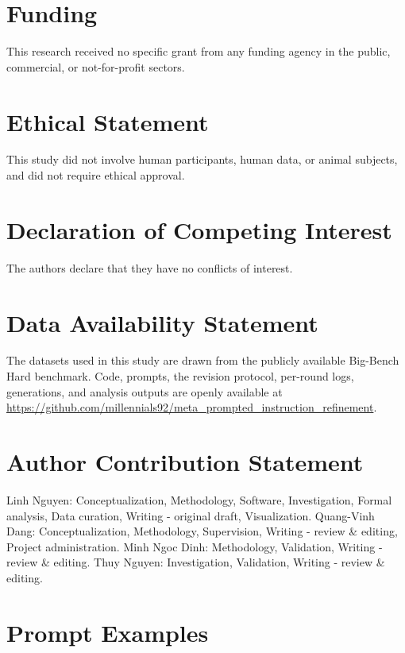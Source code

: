 \documentclass{ieeeaccess}
\begin{document}
\section{Funding}

This research received no specific grant from any funding agency in the public, commercial, or not-for-profit sectors.

\section{Ethical Statement}

This study did not involve human participants, human data, or animal subjects, and did not require ethical approval.

\section{Declaration of Competing Interest}

The authors declare that they have no conflicts of interest.

\section{Data Availability Statement}

The datasets used in this study are drawn from the publicly available Big-Bench Hard benchmark. Code, prompts, the revision protocol, per-round logs, generations, and analysis outputs are openly available at \url{https://github.com/millennials92/meta_prompted_instruction_refinement}.

\section{Author Contribution Statement}

Linh Nguyen: Conceptualization, Methodology, Software, Investigation, Formal analysis, Data curation, Writing - original draft, Visualization. Quang-Vinh Dang: Conceptualization, Methodology, Supervision, Writing - review \& editing, Project administration. Minh Ngoc Dinh: Methodology, Validation, Writing - review \& editing. Thuy Nguyen: Investigation, Validation, Writing - review \& editing.

\appendices

\section{Prompt Examples}
\end{document}

